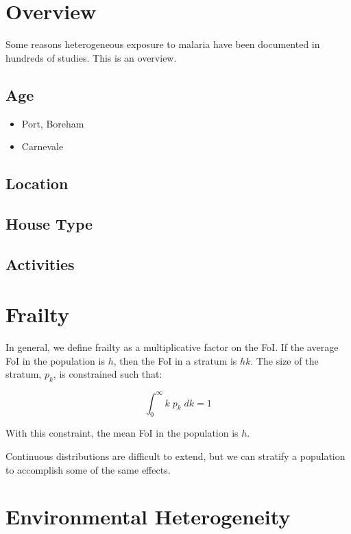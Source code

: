 \documentclass[
]{book}
\begin{document}
\section{Overview}\label{overview-1}

Some reasons heterogeneous exposure to malaria have been documented in hundreds of studies. This is an overview.

\subsection{Age}\label{age-1}

\begin{itemize}
\item
  Port, Boreham
\item
  Carnevale
\end{itemize}

\subsection{Location}\label{location}

\subsection{House Type}\label{house-type}

\subsection{Activities}\label{activities}

\section{Frailty}\label{frailtyCh}

In general, we define frailty as a multiplicative factor on the FoI. If the average FoI in the population is \(h\), then the FoI in a stratum is \(hk\). The size of the stratum, \(p_k\), is constrained such that:

\[\int_0^\infty k \; p_k \; dk = 1\]

With this constraint, the mean FoI in the population is \(h\).

Continuous distributions are difficult to extend, but we can stratify a population to accomplish some of the same effects.

\section{Environmental Heterogeneity}\label{environmentalHeterogeneity}
\end{document}
